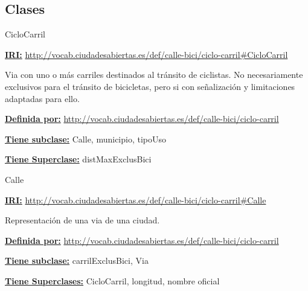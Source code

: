 \subsection{Clases}



\begin{mybox}{CicloCarril}
\begin{flushleft}
\underline{\textbf{IRI:}}
\url{http://vocab.ciudadesabiertas.es/def/calle-bici/ciclo-carril#CicloCarril}
\newline

Via con uno o más carriles destinados al tránsito de ciclistas. No necesariamente exclusivos para el tránsito de bicicletas, pero si con señalización y limitaciones adaptadas para ello.
\newline

\underline{\textbf{Definida por:}}
\url{http://vocab.ciudadesabiertas.es/def/calle-bici/ciclo-carril}
\newline

\underline{\textbf{Tiene subclase:}}
\newline Calle,\hspace{2em} municipio,\hspace{2em} tipoUso
\newline 

\underline{\textbf{Tiene Superclase:}}
\newline distMaxExclusBici

\end{flushleft}
\end{mybox}





\begin{mybox}{Calle}
\begin{flushleft}
\underline{\textbf{IRI:}}
\url{http://vocab.ciudadesabiertas.es/def/calle-bici/ciclo-carril#Calle}
\newline

Representación de una via de una ciudad.
\newline

\underline{\textbf{Definida por:}}
\url{http://vocab.ciudadesabiertas.es/def/calle-bici/ciclo-carril}
\newline

\underline{\textbf{Tiene subclase:}}
\newline carrilExclusBici,\hspace{2em} Via
\newline 

\underline{\textbf{Tiene Superclases:}}
\newline CicloCarril,\hspace{2em} longitud,\hspace{2em} nombre oficial

\end{flushleft}
\end{mybox}

